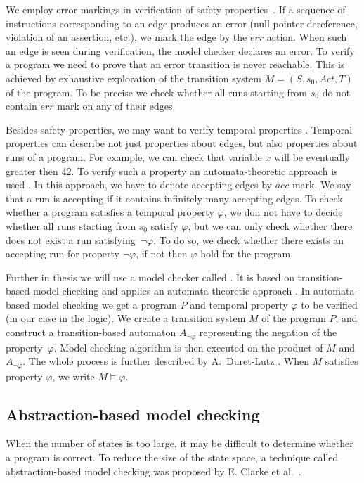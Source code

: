 We employ error markings in verification of safety properties~\cite{Manna92}.  If a
sequence of instructions corresponding to an edge produces an error (null
pointer dereference, violation of an assertion, etc.), we mark the edge by the
$err$ action. When such an edge is seen during verification, the model checker
declares an error. To verify a program we need to prove that an error transition
is never reachable. This is achieved by exhaustive exploration of the transition
system $M = (S, s_0, Act, T)$ of the program. To be precise we check whether all
runs starting from $s_0$ do not contain $err$ mark on any of their edges.

Besides safety properties, we may want to verify temporal properties
\cite{Manna92}. Temporal properties can describe not just properties about
edges, but also properties about runs of a program. For example, we can check
that variable $x$ will be eventually greater then 42. To verify such a property
an automata-theoretic approach is used \cite{Vardi96}. In this approach, we have
to denote accepting edges by $acc$ mark. We say that a run is accepting if it
contains infinitely many accepting edges. To check whether a program satisfies a
temporal property $\varphi$, we don not have to decide whether all runs starting
from $s_0$ satisfy $\varphi$, but we can only check whether there does not exist
a run satisfying~$\neg \varphi$. To do so, we check whether there exists an
accepting run for property $\neg \varphi$, if not then $\varphi$ hold for the
program.

Further in thesis we will use a model checker called \DIVINE. It is based on
transition-based model checking and applies an automata-theoretic approach
\cite{Vardi96}. In automata-based model checking we get a program $P$
and temporal property $\varphi$ to be verified (in our case in the \LTL logic).
We create a transition system $M$ of the program $P$, and construct a
transition-based automaton $A_{\neg \varphi}$ representing the negation of the
property~$\varphi$. Model checking algorithm is then executed on the product of
$M$ and $A_{\neg \varphi}$. The whole process is further described by
A.~Duret-Lutz \cite{Duret04}. When $M$ satisfies property $\varphi$, we write
$M \models \varphi$.

\subsection{Abstraction-based model checking} \label{subsec:amc}

When the number of states is too large, it may be difficult to determine whether a
program is correct. To reduce the size of the state space, a technique called
abstraction-based model checking was proposed by E. Clarke et al.~\cite{Clarke94}.

